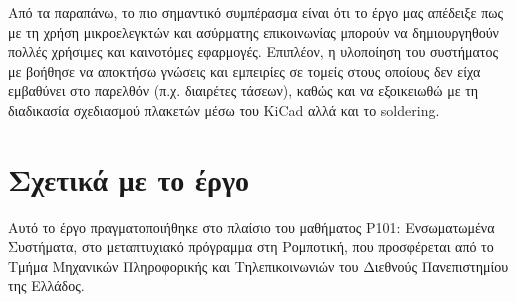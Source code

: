 \documentclass[conference]{IEEEtran}
\begin{document}
Από τα παραπάνω, το πιο σημαντικό συμπέρασμα είναι ότι το έργο μας απέδειξε πως με τη χρήση μικροελεγκτών και ασύρματης επικοινωνίας μπορούν να δημιουργηθούν πολλές χρήσιμες και καινοτόμες εφαρμογές. Επιπλέον, η υλοποίηση του συστήματος με βοήθησε να αποκτήσω γνώσεις και εμπειρίες σε τομείς στους οποίους δεν είχα εμβαθύνει στο παρελθόν (π.χ. διαιρέτες τάσεων), καθώς και να εξοικειωθώ με τη διαδικασία σχεδιασμού πλακετών μέσω του KiCad αλλά και το soldering.

\section{Σχετικά με το έργο}
Αυτό το έργο πραγματοποιήθηκε στο πλαίσιο του μαθήματος Ρ101: Ενσωματωμένα Συστήματα, στο μεταπτυχιακό πρόγραμμα στη Ρομποτική, που προσφέρεται από το Τμήμα Μηχανικών Πληροφορικής και Τηλεπικοινωνιών του Διεθνούς Πανεπιστημίου της Ελλάδος.
\end{document}
